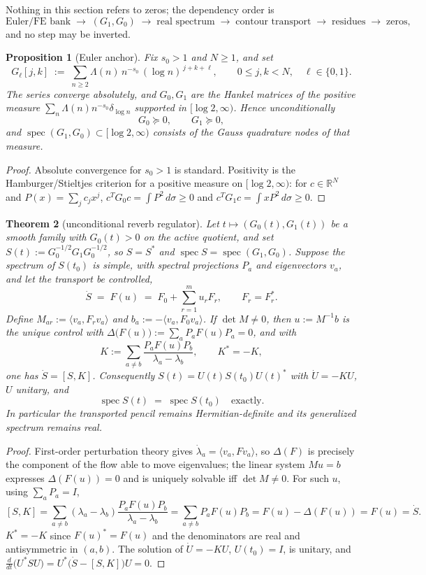 \documentclass[11pt]{article}
\theoremstyle{plain}
\newtheorem{theorem}{Theorem}
\newtheorem{proposition}[theorem]{Proposition}
\theoremstyle{definition}
\theoremstyle{remark}
\newcommand{\R}{\mathbb{R}}
\newcommand{\Lam}{\Lambda}
\DeclareMathOperator{\spec}{spec}
\begin{document}
Nothing in this section refers to zeros; the dependency order is
\[
  \text{Euler/FE bank}\;\to\;(G_1,G_0)\;\to\;\text{real spectrum}\;\to\;
  \text{contour transport}\;\to\;\text{residues}\;\to\;\text{zeros},
\]
and no step may be inverted.

\begin{proposition}[Euler anchor]\label{prop:anchor}
Fix $s_0>1$ and $N\ge1$, and set
\[
  G_\ell[j,k] \;:=\; \sum_{n\ge2} \Lam(n)\,n^{-s_0}\,(\log n)^{\,j+k+\ell},
  \qquad 0\le j,k<N,\quad \ell\in\{0,1\}.
\]
The series converge absolutely, and $G_0,G_1$ are the Hankel matrices of the positive
measure $\sum_n \Lam(n)n^{-s_0}\delta_{\log n}$ supported in $[\log 2,\infty)$. Hence
unconditionally
\[
  G_0 \succeq 0,\qquad G_1 \succeq 0,
\]
and $\spec(G_1,G_0)\subset[\log2,\infty)$ consists of the Gauss quadrature nodes of that
measure.
\end{proposition}

\begin{proof}
Absolute convergence for $s_0>1$ is standard. Positivity is the Hamburger/Stieltjes
criterion for a positive measure on $[\log2,\infty)$: for $c\in\R^N$ and
$P(x)=\sum_j c_jx^j$, $c^{T}G_0c=\int P^2\,d\sigma\ge0$ and
$c^{T}G_1c=\int xP^2\,d\sigma\ge0$.
\end{proof}

\begin{theorem}[unconditional reverb regulator]\label{thm:regulator}
Let $t\mapsto (G_0(t),G_1(t))$ be a smooth family with $G_0(t)>0$ on the active quotient,
and set $S(t):=G_0^{-1/2}G_1G_0^{-1/2}$, so $S=S^{*}$ and
$\spec S=\spec(G_1,G_0)$. Suppose the spectrum of $S(t_0)$ is simple, with spectral
projections $P_a$ and eigenvectors $v_a$, and let the transport be controlled,
\[
  \dot S \;=\; F(u) \;=\; F_0 + \sum_{r=1}^{m} u_r F_r ,
  \qquad F_r = F_r^{*}.
\]
Define $M_{ar} := \langle v_a, F_r v_a\rangle$ and $b_a := -\langle v_a,F_0v_a\rangle$.
If $\det M \ne 0$, then $u := M^{-1}b$ is the unique control with
$\Delta\bigl(F(u)\bigr):=\sum_a P_aF(u)P_a = 0$, and with
\[
  K := \sum_{a\ne b}\frac{P_aF(u)P_b}{\lambda_a-\lambda_b},
  \qquad K^{*}=-K,
\]
one has $\dot S = [S,K]$. Consequently $S(t)=U(t)S(t_0)U(t)^{*}$ with $\dot U=-KU$,
$U$ unitary, and
\[
  \spec S(t) \;=\; \spec S(t_0)\quad\text{exactly.}
\]
In particular the transported pencil remains Hermitian-definite and its generalized
spectrum remains real.
\end{theorem}

\begin{proof}
First-order perturbation theory gives $\dot\lambda_a=\langle v_a,F v_a\rangle$, so
$\Delta(F)$ is precisely the component of the flow able to move eigenvalues; the linear
system $Mu=b$ expresses $\Delta(F(u))=0$ and is uniquely solvable iff $\det M\ne0$.
For such $u$, using $\sum_aP_a=I$,
\[
  [S,K]=\sum_{a\ne b}(\lambda_a-\lambda_b)\frac{P_aF(u)P_b}{\lambda_a-\lambda_b}
  =\sum_{a\ne b}P_aF(u)P_b=F(u)-\Delta(F(u))=F(u)=\dot S .
\]
$K^{*}=-K$ since $F(u)^{*}=F(u)$ and the denominators are real and antisymmetric in
$(a,b)$. The solution of $\dot U=-KU$, $U(t_0)=I$, is unitary, and
$\frac{d}{dt}\bigl(U^{*}SU\bigr)=U^{*}\bigl(\dot S-[S,K]\bigr)U=0$.
\end{proof}
\end{document}
